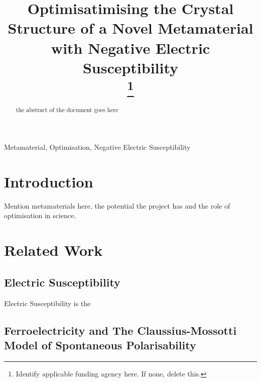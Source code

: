 \documentclass[conference]{IEEEtran}
\begin{document}
\title{Optimisatimising the Crystal Structure of a Novel Metamaterial with
 Negative Electric Susceptibility\\
\thanks{Identify applicable funding agency here. If none, delete this.}
}



\author{
\and
{}
}

\maketitle

\begin{abstract}
the abstract of the document goes here
\end{abstract}

\begin{IEEEkeywords}
Metamaterial, Optimisation, Negative Electric Susceptibility
\end{IEEEkeywords}

\section{Introduction}
Mention metamaterials here, the potential the project has and the role of 
optimisation in science.

\section{Related Work}

\subsection{Electric Susceptibility}

Electric Susceptibility is the

\subsection{Ferroelectricity and The Claussius-Mossotti Model of Spontaneous 
Polarisability}
\end{document}
